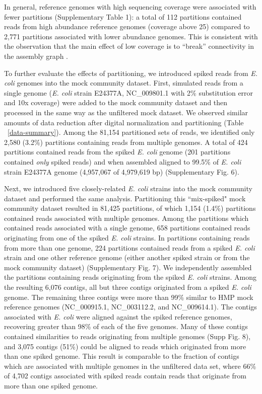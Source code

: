 \documentclass{nature}%
\begin{document}
In general, reference genomes with high sequencing coverage were
associated with fewer partitions (Supplementary Table 1): a
total of 112 partitions contained reads from high abundance reference
genomes (coverage above 25) compared to 2,771 partitions associated
with lower abundance genomes.  This is consistent
with the observation that the main effect of low coverage is to
``break'' connectivity in the assembly graph \cite{Chaisson:2008p1373,Pevzner:2001p1374}.

To further evaluate the effects of partitioning, we introduced spiked reads from
\emph{E. coli} genomes into the mock community
dataset. First, simulated reads from a single genome (\emph{E. coli} strain
E24377A, NC\_009801.1 with 2\% substitution error and 10x coverage) were added to the
mock community dataset and then processed in the same way as the
unfiltered mock dataset.  We observed similar amounts of data
reduction after digital normalization and partitioning (Table
~\ref{data-summary}).  Among the 81,154 partitioned sets of reads, we
identified only 2,580 (3.2\%) partitions containing reads from
multiple genomes.  A total of 424 partitions contained reads from the
spiked \emph{E. coli} genome (201 partitions contained \emph{only}
spiked reads) and when assembled aligned to 99.5\% of \emph{E. coli}
strain E24377A genome (4,957,067 of 4,979,619 bp) (Supplementary Fig. 6).

Next, we introduced five closely-related \emph{E. coli} strains into the mock
community dataset and performed the same analysis.
Partitioning this ``mix-spiked" mock community
dataset resulted in 81,425 partitions, of which 1,154 (1.4\%)
partitions contained reads associated with multiple genomes.  Among
the partitions which contained reads associated with a single genome,
658 partitions contained reads originating from one of the spiked
\emph{E. coli} strains.  In partitions containing reads from more than
one genome, 224 partitions contained reads from a spiked
\emph{E. coli} strain and one other reference genome (either another
spiked strain or from the mock community dataset) (Supplementary Fig. 7).  We
independently assembled the partitions containing reads originating
from the spiked \emph{E. coli} strains.  Among the resulting 6,076
contigs, all but three contigs originated from a spiked \emph{E. coli}
genome.  The remaining three contigs were more than 99\% similar to
HMP mock reference genomes (NC\_000915.1, NC\_003112.2, and
NC\_009614.1).  The contigs associated with \emph{E. coli} were
aligned against the spiked reference genomes, recovering greater than
98\% of each of the five genomes.  Many of these contigs contained
similarities to reads originating from multiple genomes (Supp Fig. 8),
and 3,075 contigs (51\%) could be aligned to reads which originated from
more than one spiked genome.  This result is comparable to the
fraction of contigs which are associated with multiple genomes in the
unfiltered data set, where 66\% of 4,702 contigs associated with
spiked reads contain reads that originate from more than one spiked
genome.
\end{document}
